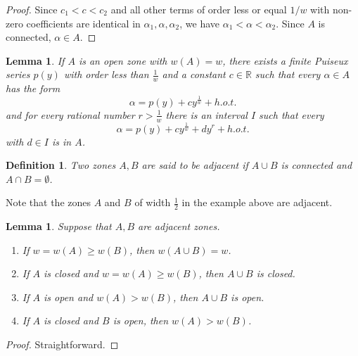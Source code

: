 \documentclass[article]{amsart}
\newtheorem{lemma}[theorem]{Lemma}
\newtheorem{definition}[theorem]{Definition}
\newcommand{\R}{\mathbb R}
\newcommand{\0}{{\bf 0}}
\begin{document}
\begin{proof}Since $c_1 < c < c_2$ and all other terms of order less or equal $1/w$ with non-zero coefficients are identical
in $\alpha_1, \alpha, \alpha_2$, we have $\alpha_1 < \alpha <\alpha_2$.  Since $A$ is connected,
$\alpha \in A$.
\end{proof}

\begin{lemma}  If $A$ is an open zone with $w(A) = w$, there exists a finite Puiseux series $p(y)$ with order less than $\frac{1}{w}$ and a 
constant $c \in \R$ such that every $\alpha \in A$ has the form
$$
\alpha = p(y) + cy^{\frac{1}{w}} + h.o.t.
$$
and for every rational  number $r > \frac{1}{w}$ there is an interval $I$ such that every $$\alpha = p(y) + cy^{\frac{1}{w}} + dy^r +h.o.t.$$
with $d\in I$ is in $A$.  
\end{lemma}

\smallskip

\begin{definition}  Two zones $A, B$ are said to be {\it adjacent} if $A\cup B$ is connected and $A\cap B = \emptyset $.
\end{definition}

Note that the zones $A$ and $B$ of width $\frac{1}{2}$ in the example above are adjacent.  

\begin{lemma} \label{openclosed} Suppose that $A, B$ are adjacent zones. 
\begin{enumerate}
\item If $w = w(A)\ge w(B)$, then $w(A \cup B) = w$.
\item If $A$ is closed and $w = w(A)\ge w(B)$, then $A \cup B$ is closed.
\item If $A$ is open and $w(A) > w(B)$, then $A \cup B$ is open.
\item If $A$ is closed and $B$ is open, then $w(A)> w(B)$.
\end{enumerate}
\end{lemma} 
\begin{proof}  Straightforward.
\end{proof}
 
\end{document}
